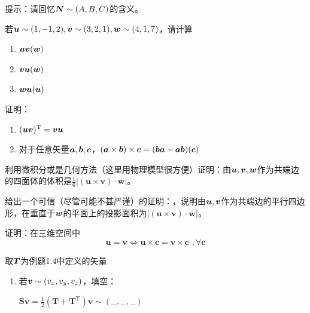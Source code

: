 \begin{exercise}
\begin{enumerate}
        提示：请回忆$\boldsymbol{N}\sim (A,B,C)$的含义。
    \end{enumerate}
    \item 若$\boldsymbol{u}\sim (1,-1,2),\boldsymbol{v}\sim (3,2,1),\boldsymbol{w}\sim (4,1,7)$，请计算
    \begin{enumerate}
        \item $\boldsymbol{uv}(\boldsymbol{w})$
        \item $\boldsymbol{vu}(\boldsymbol{w})$
        \item $\boldsymbol{wu}(\boldsymbol{u})$
    \end{enumerate}
    \item 证明：
    \begin{enumerate}
        \item $(\boldsymbol{uv})^{\mathrm{T}}=\boldsymbol{vu}$
        \item 对于任意矢量$\boldsymbol{a},\boldsymbol{b},\boldsymbol{c}$，$(\boldsymbol{a}\times\boldsymbol{b})\times \boldsymbol{c}=(\boldsymbol{ba}-\boldsymbol{ab})(\boldsymbol{c})$
    \end{enumerate}
    \item 利用微积分或是几何方法（这里用物理模型很方便）证明：由$\boldsymbol{u},\boldsymbol{v},\boldsymbol{w}$作为共端边的四面体的体积是$\frac{1}{6}\left| \left( \boldsymbol{u}\times \boldsymbol{v} \right) \cdot \boldsymbol{w} \right|$。
    \item 给出一个可信（尽管可能不甚严谨）的证明：，说明由$\boldsymbol{u},\boldsymbol{v}$作为共端边的平行四边形，在垂直于$\boldsymbol{w}$的平面上的投影面积为$\left| \left( \boldsymbol{u}\times \boldsymbol{v} \right) \cdot \overline{\boldsymbol{w}} \right|$。
    \item 证明：在三维空间中\label{exercise:1.16}
    \begin{equation*}
        \boldsymbol{u}=\boldsymbol{v}\Longleftrightarrow \boldsymbol{u}\times \boldsymbol{c}=\boldsymbol{v}\times \boldsymbol{c}\,\, ,\forall \boldsymbol{c}
    \end{equation*}
    \item 取$\boldsymbol{T}$为例题1.4中定义的矢量\label{exercise:1.17}
    \begin{enumerate}
        \item 若$\boldsymbol{v}\sim (v_x,v_y,v_z)$，填空：
        
        $\boldsymbol{Sv}=\frac{1}{2}\left( \boldsymbol{T}+\boldsymbol{T}^{\mathrm{T}} \right) \boldsymbol{v}\sim \left( \_\_,\_\_,\_\_ \right) $


\end{enumerate}
\end{exercise}
